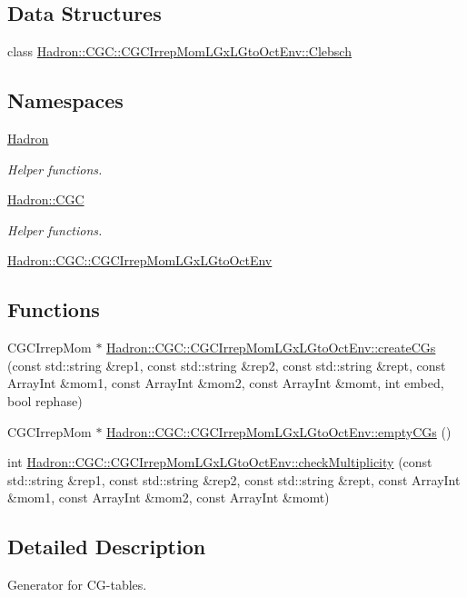 \subsection*{Data Structures}
\begin{DoxyCompactItemize}
\item 
class \mbox{\hyperlink{classHadron_1_1CGC_1_1CGCIrrepMomLGxLGtoOctEnv_1_1Clebsch}{Hadron\+::\+C\+G\+C\+::\+C\+G\+C\+Irrep\+Mom\+L\+Gx\+L\+Gto\+Oct\+Env\+::\+Clebsch}}
\end{DoxyCompactItemize}
\subsection*{Namespaces}
\begin{DoxyCompactItemize}
\item 
 \mbox{\hyperlink{namespaceHadron}{Hadron}}
\begin{DoxyCompactList}\small\item\em Helper functions. \end{DoxyCompactList}\item 
 \mbox{\hyperlink{namespaceHadron_1_1CGC}{Hadron\+::\+C\+GC}}
\begin{DoxyCompactList}\small\item\em Helper functions. \end{DoxyCompactList}\item 
 \mbox{\hyperlink{namespaceHadron_1_1CGC_1_1CGCIrrepMomLGxLGtoOctEnv}{Hadron\+::\+C\+G\+C\+::\+C\+G\+C\+Irrep\+Mom\+L\+Gx\+L\+Gto\+Oct\+Env}}
\end{DoxyCompactItemize}
\subsection*{Functions}
\begin{DoxyCompactItemize}
\item 
C\+G\+C\+Irrep\+Mom $\ast$ \mbox{\hyperlink{namespaceHadron_1_1CGC_1_1CGCIrrepMomLGxLGtoOctEnv_a326be3440106df05ce61c23e713f7312}{Hadron\+::\+C\+G\+C\+::\+C\+G\+C\+Irrep\+Mom\+L\+Gx\+L\+Gto\+Oct\+Env\+::create\+C\+Gs}} (const std\+::string \&rep1, const std\+::string \&rep2, const std\+::string \&rept, const Array\+Int \&mom1, const Array\+Int \&mom2, const Array\+Int \&momt, int embed, bool rephase)
\item 
C\+G\+C\+Irrep\+Mom $\ast$ \mbox{\hyperlink{namespaceHadron_1_1CGC_1_1CGCIrrepMomLGxLGtoOctEnv_afd66508df18d3aba9ecfc7d3ad09e448}{Hadron\+::\+C\+G\+C\+::\+C\+G\+C\+Irrep\+Mom\+L\+Gx\+L\+Gto\+Oct\+Env\+::empty\+C\+Gs}} ()
\item 
int \mbox{\hyperlink{namespaceHadron_1_1CGC_1_1CGCIrrepMomLGxLGtoOctEnv_aa39bf5f462bddb44a91da07a903947f4}{Hadron\+::\+C\+G\+C\+::\+C\+G\+C\+Irrep\+Mom\+L\+Gx\+L\+Gto\+Oct\+Env\+::check\+Multiplicity}} (const std\+::string \&rep1, const std\+::string \&rep2, const std\+::string \&rept, const Array\+Int \&mom1, const Array\+Int \&mom2, const Array\+Int \&momt)
\end{DoxyCompactItemize}


\subsection{Detailed Description}
Generator for C\+G-\/tables. 

